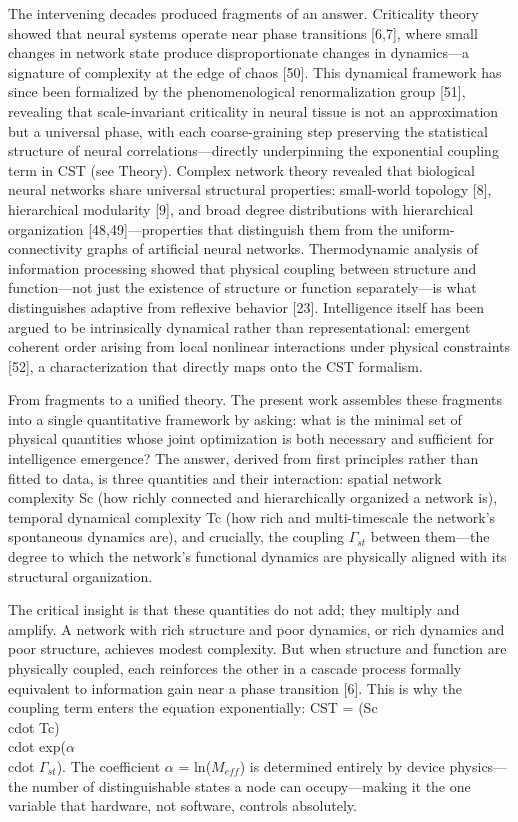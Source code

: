 \documentclass[a4paper,12pt]{article}
\begin{document}
The intervening decades produced fragments of an answer. Criticality theory showed that neural systems operate near phase transitions [6,7], where small changes in network state produce disproportionate changes in dynamics---a signature of complexity at the edge of chaos [50]. This dynamical framework has since been formalized by the phenomenological renormalization group [51], revealing that scale-invariant criticality in neural tissue is not an approximation but a universal phase, with each coarse-graining step preserving the statistical structure of neural correlations---directly underpinning the exponential coupling term in CST (see Theory). Complex network theory revealed that biological neural networks share universal structural properties: small-world topology [8], hierarchical modularity [9], and broad degree distributions with hierarchical organization [48,49]---properties that distinguish them from the uniform-connectivity graphs of artificial neural networks. Thermodynamic analysis of information processing showed that physical coupling between structure and function---not just the existence of structure or function separately---is what distinguishes adaptive from reflexive behavior [23]. Intelligence itself has been argued to be intrinsically dynamical rather than representational: emergent coherent order arising from local nonlinear interactions under physical constraints [52], a characterization that directly maps onto the CST formalism.


From fragments to a unified theory. The present work assembles these fragments into a single quantitative framework by asking: what is the minimal set of physical quantities whose joint optimization is both necessary and sufficient for intelligence emergence? The answer, derived from first principles rather than fitted to data, is three quantities and their interaction: spatial network complexity Sc (how richly connected and hierarchically organized a network is), temporal dynamical complexity Tc (how rich and multi-timescale the network's spontaneous dynamics are), and crucially, the coupling $\Gamma_{st}$ between them---the degree to which the network's functional dynamics are physically aligned with its structural organization.


The critical insight is that these quantities do not add; they multiply and amplify. A network with rich structure and poor dynamics, or rich dynamics and poor structure, achieves modest complexity. But when structure and function are physically coupled, each reinforces the other in a cascade process formally equivalent to information gain near a phase transition [6]. This is why the coupling term enters the equation exponentially: CST = (Sc  \\cdot  Tc)  \\cdot  exp($\alpha$  \\cdot  $\Gamma_{st}$). The coefficient $\alpha$ = ln($M_{eff}$) is determined entirely by device physics---the number of distinguishable states a node can occupy---making it the one variable that hardware, not software, controls absolutely.
\end{document}
